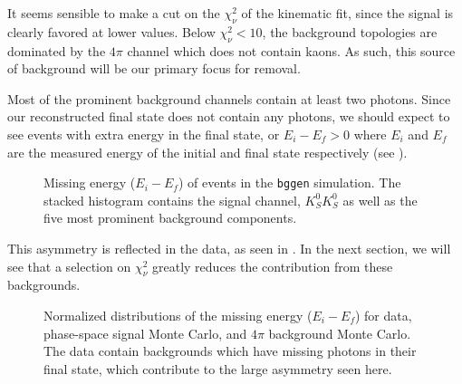 It seems sensible to make a cut on the $\chi^2_\nu$ of the kinematic fit, since the signal is clearly favored at lower values. Below $\chi^2_\nu < 10$, the background topologies are dominated by the $4\pi$ channel which does not contain kaons. As such, this source of background will be our primary focus for removal.

Most of the prominent background channels contain at least two photons. Since our reconstructed final state does not contain any photons, we should expect to see events with extra energy in the final state, or $E_i - E_f > 0$ where $E_i$ and $E_f$ are the measured energy of the initial and final state respectively (see ).

\begin{figure}
  \begin{center}
    
  \end{center}
  \caption{Missing energy ($E_i - E_f$) of events in the \texttt{bggen} simulation. The stacked histogram contains the signal channel, $K_S^0K_S^0$ as well as the five most prominent background components.}\label{fig:me-bggen}
\end{figure}

This asymmetry is reflected in the data, as seen in . In the next section, we will see that a selection on $\chi^2_\nu$ greatly reduces the contribution from these backgrounds.

\begin{figure}
  \begin{center}
    
  \end{center}
  \caption{Normalized distributions of the missing energy ($E_i - E_f$) for data, phase-space signal Monte Carlo, and $4\pi$ background Monte Carlo. The data contain backgrounds which have missing photons in their final state, which contribute to the large asymmetry seen here.}\label{fig:me-combined}
\end{figure}

